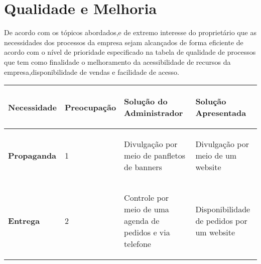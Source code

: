 \section{Qualidade e Melhoria}

De acordo com os tópicos abordados,e de extremo interesse do proprietário que as necessidades dos processos da empresa sejam alcançados de forma eficiente de acordo com o nível de  prioridade especificado na tabela de qualidade de processos que tem como finalidade o melhoramento da acessibilidade de recursos da empresa,disponibilidade de vendas e facilidade de acesso. 

\begin{table}[H]
    \centering
      \begin{tabular}{| m{4cm} | m{4cm} | m{4cm} | m{4cm} |}
        \hline
        \begin{center} \textbf{Necessidade} \end{center}  & \begin{center} \textbf{Preocupação} \end{center}  & \begin{center} \textbf{Solução do Administrador} \end{center} & \begin{center} \textbf{Solução Apresentada} \end{center}    \\ \hline
        \begin{center} \textbf{Propaganda} \end{center}  & \begin{center} 1 \end{center}  & \begin{center} Divulgação por meio de panfletos de banners \end{center} & \begin{center} Divulgação por meio de um website \end{center}    \\ \hline
        \begin{center} \textbf{Entrega} \end{center}  & \begin{center} 2 \end{center}  & \begin{center} Controle por meio de uma agenda de pedidos e via telefone \end{center} & \begin{center} Disponibilidade de pedidos por um website \end{center}    \\ \hline

\end{tabular}
\end{table}
